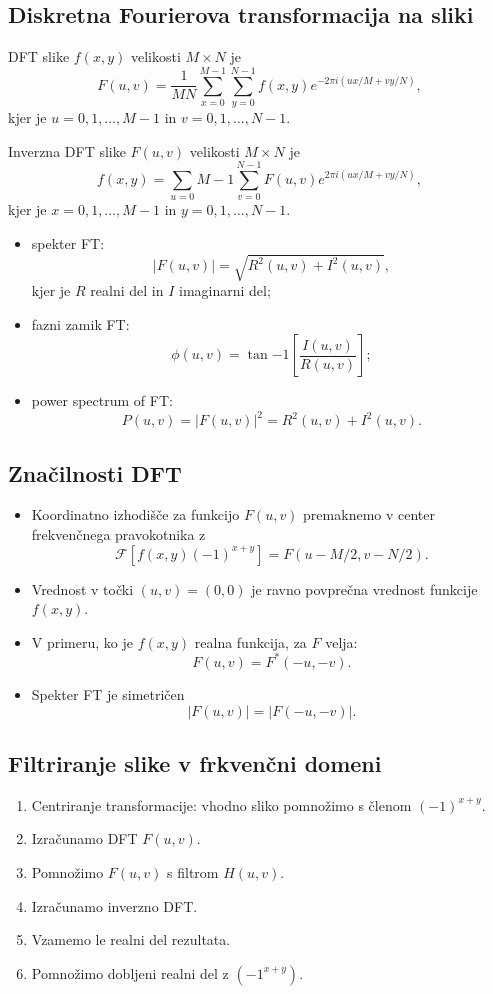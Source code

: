 \subsection{Diskretna Fourierova transformacija na sliki}
DFT slike $f(x,y)$ velikosti $M\times N$ je
$$F(u,v) = \frac{1}{MN}\sum_{x=0}^{M-1}\sum_{y=0}^{N-1}f(x,y)e^{-2\pi i (ux/M + vy/N)},$$
kjer je $u = 0,1,\ldots, M-1$ in $v = 0,1,\ldots,N-1$.

Inverzna DFT slike $F(u,v)$ velikosti $M\times N$ je
$$f(x,y) = \sum_{u = 0}{M-1}\sum_{v = 0}^{N-1} F(u,v) e^{2\pi i (ux/M+vy/N)},$$
kjer je $x = 0,1,\ldots,M-1$ in $y = 0,1,\ldots,N-1$.

\begin{itemize}
\item spekter FT:
$$|F(u,v)| = \sqrt{R^2(u,v) + I^2(u,v)},$$
kjer je $R$ realni del in $I$ imaginarni del;
\item fazni zamik FT:
$$\phi(u,v) = \tan{-1} \left[\frac{I(u,v)}{R(u,v)}\right];$$
\item power spectrum of FT:
$$P(u,v) = |F(u,v)|^2 = R^2(u,v) + I^2(u,v).$$
\end{itemize}
%
\subsection{Značilnosti DFT}
\begin{itemize}
\item Koordinatno izhodišče za funkcijo $F(u,v)$ premaknemo v center frekvenčnega pravokotnika z
$$\mathcal{F}[f(x,y)(-1)^{x+y}] = F(u-M/2,v-N/2).$$
\item Vrednost v točki $(u,v) = (0,0)$ je ravno povprečna vrednost funkcije $f(x,y)$.
\item V primeru, ko je $f(x,y)$ realna funkcija, za $F$ velja:
$$F(u,v) = F^*(-u,-v).$$
\item Spekter FT je simetričen
$$|F(u,v)| = |F(-u,-v)|.$$ 
\end{itemize}
%
\subsection{Filtriranje slike v frkvenčni domeni}
\begin{enumerate}
\item Centriranje transformacije: vhodno sliko pomnožimo s členom $(-1)^{x+y}$.
\item Izračunamo DFT $F(u,v)$.
\item Pomnožimo $F(u,v)$ s filtrom $H(u,v)$.
\item Izračunamo inverzno DFT.
\item Vzamemo le realni del rezultata.
\item Pomnožimo dobljeni realni del z $(-1^{x+y})$.
\end{enumerate}
%
